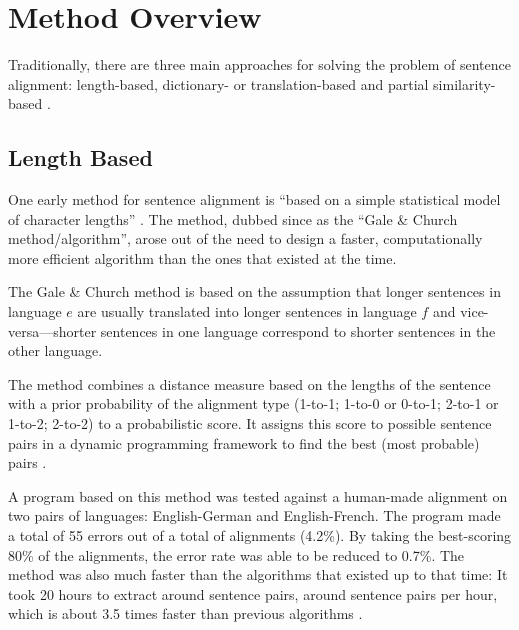 \section{Method Overview}
\label{sec:overview_senalign}
Traditionally, there are three main approaches for solving the problem of sentence alignment:  length-based, dictionary- or translation-based and partial similarity-based \autocite{hunalign}. 

\subsection{Length Based}
One early method for sentence alignment is %
\enquote{based on a simple statistical model of character lengths} \autocite{gale-church-1991-program}. The method, dubbed since as the \enquote{Gale \& Church method/algorithm}, arose out of the need to design a faster, computationally more efficient algorithm than the ones that existed at the time\footnotemark.


The Gale \& Church method is based on the assumption that longer sentences in language \(e\) are usually translated into longer sentences in language \(f\) and vice-versa---shorter sentences in one language correspond to shorter sentences in the other language.

The method combines a distance measure based on the lengths of the sentence with a prior probability of the alignment type (1-to-1; 1-to-0 or 0-to-1; 2-to-1 or 1-to-2; 2-to-2) to a probabilistic score. 
It assigns this score to possible sentence pairs in a dynamic programming framework to find the best (most probable) pairs \autocite[57]{koehn2009}. 

A program based on this method was tested against a human-made alignment on two pairs of languages: English-German and English-French. 
The program made a total of 55 errors out of a total of  alignments (4.2\%). 
By taking the best-scoring 80\% of the alignments, the error rate was able to be reduced to 0.7\%.
The method was also much faster than the algorithms that existed up to that time: 
It took 20 hours to extract around  sentence pairs, around  sentence pairs per hour, which is about 3.5 times faster than previous algorithms \autocite{gale-church-1991-program}.

